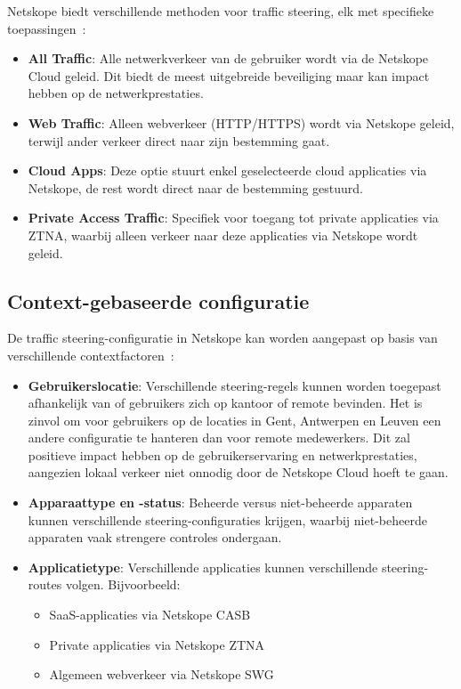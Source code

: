 Netskope biedt verschillende methoden voor traffic steering, elk met specifieke toepassingen~\autocite{Netskope2025-3}:

\begin{itemize}
    \item \textbf{All Traffic}: Alle netwerkverkeer van de gebruiker wordt via de Netskope Cloud geleid. Dit biedt de meest uitgebreide beveiliging maar kan impact hebben op de netwerkprestaties.
    \item \textbf{Web Traffic}: Alleen webverkeer (HTTP/HTTPS) wordt via Netskope geleid, terwijl ander verkeer direct naar zijn bestemming gaat.
    \item \textbf{Cloud Apps}: Deze optie stuurt enkel geselecteerde cloud applicaties via Netskope, de rest wordt direct naar de bestemming gestuurd.
    \item \textbf{Private Access Traffic}: Specifiek voor toegang tot private applicaties via ZTNA, waarbij alleen verkeer naar deze applicaties via Netskope wordt geleid.
\end{itemize}
\subsection{Context-gebaseerde configuratie}

De traffic steering-configuratie in Netskope kan worden aangepast op basis van verschillende contextfactoren~\autocite{Netskope2025-3}:

\begin{itemize}
    \item \textbf{Gebruikerslocatie}: Verschillende steering-regels kunnen worden toegepast afhankelijk van of gebruikers zich op kantoor of remote bevinden. Het is zinvol om voor gebruikers op de locaties in Gent, Antwerpen en Leuven een andere configuratie te hanteren dan voor remote medewerkers. Dit zal positieve impact hebben op de gebruikerservaring en netwerkprestaties, aangezien lokaal verkeer niet onnodig door de Netskope Cloud hoeft te gaan.
    \item \textbf{Apparaattype en -status}: Beheerde versus niet-beheerde apparaten kunnen verschillende steering-configuraties krijgen, waarbij niet-beheerde apparaten vaak strengere controles ondergaan.
    \item \textbf{Applicatietype}: Verschillende applicaties kunnen verschillende steering-routes volgen. Bijvoorbeeld:
        \begin{itemize}
            \item SaaS-applicaties via Netskope CASB
            \item Private applicaties via Netskope ZTNA
            \item Algemeen webverkeer via Netskope SWG
        \end{itemize}
\end{itemize}
